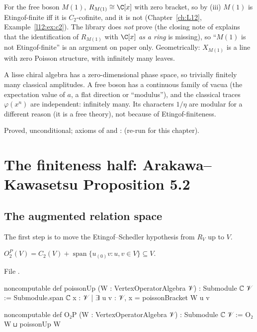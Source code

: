 \begin{remark}\label{l16:rem:boson}
For the free boson $M(1)$, $R_{M(1)}\cong\C[x]$ with zero bracket, so by (iii) $M(1)$ is Etingof-finite iff it is
$C_2$-cofinite, and it is not (Chapter~\ref{ch:L12}, Example~\ref{l12:ex:c2}). The library does \emph{not} prove
 (the closing note of  explains that the
identification of $R_{M(1)}$ with $\C[x]$ \emph{as a ring} is missing), so ``$M(1)$ is not Etingof-finite'' is an
argument on paper only. Geometrically: $X_{M(1)}$ is a line with zero Poisson structure, with infinitely many
leaves.
\end{remark}

\begin{physics}
A lisse chiral algebra has a zero-dimensional phase space, so trivially finitely many classical amplitudes. A
free boson has a continuous family of vacua (the expectation value of $a$, a flat direction or ``modulus''), and
the classical traces $\varphi(x^n)$ are independent: infinitely many. Its characters $1/\eta$ are modular for a
different reason (it is a free theory), not because of Etingof-finiteness.
\end{physics}

\begin{status}
Proved, unconditional; axioms of \allowbreak{} and
\allowbreak{}: \lean{[propext, Classical.}\allowbreak{}\allowbreak\lean{sound]} (re-run for this
chapter).
\end{status}

\section{The finiteness half: Arakawa--Kawasetsu Proposition 5.2}\label{l16:sec:prop52}

\subsection{The augmented relation space}

The first step is to move the Etingof--Schedler hypothesis from $R_V$ up to $V$.

\begin{definition}[$O_2^P(V)$]\label{l16:def:O2P}
$O_2^P(V) = C_2(V) + \operatorname{span}\{u_{(0)}v : u,v\in V\}\subseteq V$.
\end{definition}
\noindent File .
\begin{leancode}
noncomputable def poissonUp (W : VertexOperatorAlgebra 𝒱) : Submodule ℂ 𝒱 :=
  Submodule.span ℂ {x : 𝒱 | ∃ u v : 𝒱, x = poissonBracket W u v}

noncomputable def O₂P (W : VertexOperatorAlgebra 𝒱) : Submodule ℂ 𝒱 := O₂ W ⊔ poissonUp W
\end{leancode}

